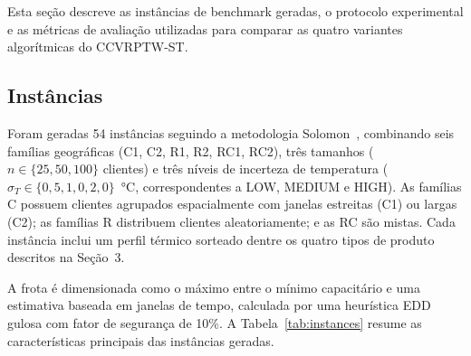 \documentclass[a4paper,11pt]{article}
\begin{document}
Esta seção descreve as instâncias de benchmark geradas, o protocolo experimental e as métricas de avaliação utilizadas para comparar as quatro variantes algorítmicas do CCVRPTW-ST.

\subsection{Inst\^ancias}

Foram geradas 54 inst\^ancias seguindo a metodologia Solomon~\citep{solomon:1987},
combinando seis famílias geográficas (C1, C2, R1, R2, RC1, RC2),
tr\^es tamanhos ($n \in \{25, 50, 100\}$ clientes) e tr\^es níveis de incerteza
de temperatura ($\sigma_T \in \{0{,}5, 1{,}0, 2{,}0\}$~°C, correspondentes a
LOW, MEDIUM e HIGH).
As famílias C possuem clientes agrupados espacialmente com janelas estreitas (C1)
ou largas (C2); as famílias R distribuem clientes aleatoriamente; e as RC são
mistas.
Cada inst\^ancia inclui um perfil térmico sorteado dentre os quatro
tipos de produto descritos na Seção~3.

A frota é dimensionada como o máximo entre o mínimo capacitário e uma
estimativa baseada em janelas de tempo, calculada por uma heurística EDD
gulosa com fator de segurança de 10\%.
A Tabela~\ref{tab:instances} resume as características principais das
inst\^ancias geradas.
\end{document}
